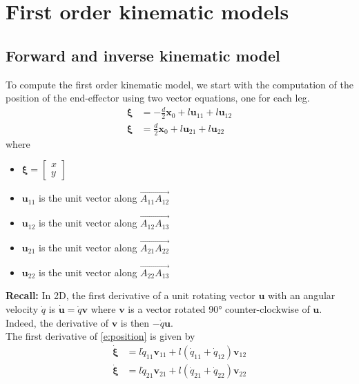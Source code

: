 \documentclass[a4paper]{article}
\begin{document}
\section{First order kinematic models}
%
\subsection{Forward and inverse kinematic model}
%
To compute the first order kinematic model, we start with the computation of the position of the end-effector using two vector equations, one for each leg.
%
\begin{equation}
    \begin{aligned}
    \boldsymbol{\xi} &=  -\frac{d}{2}\mathbf{x}_0 + l\mathbf{u}_{11} + l\mathbf{u}_{12}\\
    \boldsymbol{\xi} &= \frac{d}{2}\mathbf{x}_0 + l\mathbf{u}_{21} + l\mathbf{u}_{22}
    \end{aligned}
    \label{e:position}
\end{equation}
where 
\begin{itemize}
    \item $\boldsymbol{\xi} = \begin{bmatrix}
    x \\ y
    \end{bmatrix}$
    \item $\mathbf{u}_{11}$ is the unit vector along $\overrightarrow{A_{11}A_{12}}$
    \item $\mathbf{u}_{12}$ is the unit vector along $\overrightarrow{A_{12}A_{13}}$
    \item $\mathbf{u}_{21}$ is the unit vector along $\overrightarrow{A_{21}A_{22}}$
    \item $\mathbf{u}_{22}$ is the unit vector along $\overrightarrow{A_{22}A_{13}}$
\end{itemize}
%
\textbf{Recall:} In 2D, the first derivative of a unit rotating vector $\mathbf{u}$ with an angular velocity $\dot{q}$ is $\dot{\mathbf{u}} = \dot{q}\mathbf{v}$ where $\mathbf{v}$ is a vector rotated 90° counter-clockwise of $\mathbf{u}$. Indeed, the derivative of $\mathbf{v}$ is then $-\dot{q}\mathbf{u}$.
\\
The first derivative of \eqref{e:position} is given by
\begin{equation}
    \begin{aligned}
    \dot{\boldsymbol{\xi}} &= l\dot{q}_{11}\mathbf{v}_{11} + l(\dot{q}_{11}+\dot{q}_{12})\mathbf{v}_{12}\\
    \dot{\boldsymbol{\xi}} &= l\dot{q}_{21}\mathbf{v}_{21} + l(\dot{q}_{21}+\dot{q}_{22})\mathbf{v}_{22}
    \end{aligned}
    \label{e:velocity}
\end{equation}
\end{document}
